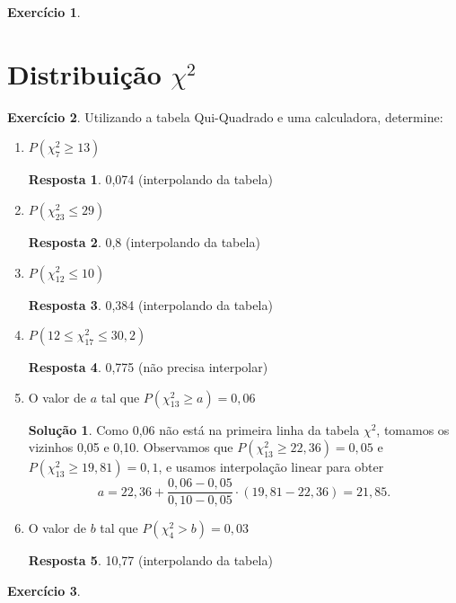 \documentclass[12pt,a4paper]{article}
\theoremstyle{definition}
\newtheorem{exercise}{Exercício}
\newtheorem*{solution}{Solução}
\newtheorem*{answer}{Resposta}
\begin{document}
\begin{exercise}
\end{exercise}

\clearpage
\section{Distribuição $\chi^2$}

\begin{exercise}
Utilizando a tabela Qui-Quadrado e uma calculadora, determine:
\begin{enumerate}
    \item $P(\chi_{7}^{2} \geq 13)$
\begin{answer}
0,074
(interpolando da tabela)
\end{answer}
    \item $P( \chi_{23}^{2}\leq 29)$
\begin{answer}
0,8
(interpolando da tabela)
\end{answer}
    \item $P(\chi_{12}^{2} \leq 10)$
\begin{answer}
0,384
(interpolando da tabela)
\end{answer}
    \item $P(12 \leq \chi_{17}^{2} \leq 30,2)$
\begin{answer}
0,775
(não precisa interpolar)
\end{answer}
    \item O valor de $a$ tal que $P(\chi_{13}^{2} \geq a) = 0,06$
\begin{solution}
Como 0,06 não está na primeira linha da tabela $\chi^2$, tomamos os vizinhos 0,05 e 0,10.
Observamos que $P(\chi_{13}^{2} \geq 22,36) = 0,05$ e $P(\chi_{13}^{2} \geq 19,81) = 0,1$, e usamos interpolação linear para obter
\[
a
=
22,36+\frac{0,06-0,05}{0,10-0,05} \cdot (19,81-22,36)
=
21,85
.
\]
\end{solution}
    \item O valor de $b$ tal que $P(\chi_{4}^{2} > b) = 0,03$
\begin{answer}
10,77
(interpolando da tabela)
\end{answer}
\end{enumerate}
\end{exercise}

\begin{exercise}
\end{exercise}
\end{document}
